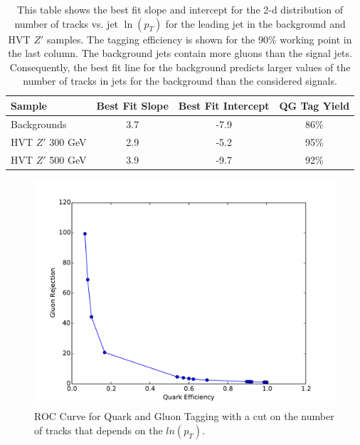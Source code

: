 \begin{table}
\begin{tabular}{|l|c|c|c|}
\hline
Sample & Best Fit Slope & Best Fit Intercept & QG Tag Yield \\\hline
Backgrounds & 3.7 & -7.9 & 86\% \\\hline
HVT $Z'$ 300 GeV &  2.9 & -5.2 & 95\% \\\hline
HVT $Z'$ 500 GeV & 3.9 & -9.7 & 92\% \\\hline
\end{tabular}
\caption{This table shows the best fit slope and intercept for the 2-d distribution of number of tracks vs. jet $\ln(p_{T})$ for the leading jet in the background and HVT $Z'$ samples. The tagging efficiency is shown for the 90\% working point in the last column. The background jets contain more gluons than the signal jets. Consequently, the best fit line for the background predicts larger values of the number of tracks in jets for the background than the considered signals.}
\label{tbl:hvtwzvbf_norm}
\end{table}

\begin{figure}[h!]
  \centering
  \includegraphics[width=\hsize]{figures/QGT/finalroc.pdf}
  \caption{ROC Curve for Quark and Gluon Tagging with a cut on the number of tracks that depends on the $ln(p_{T})$.}
  \label{fig:quark_gluon_roc}
\end{figure}
\FloatBarrier


